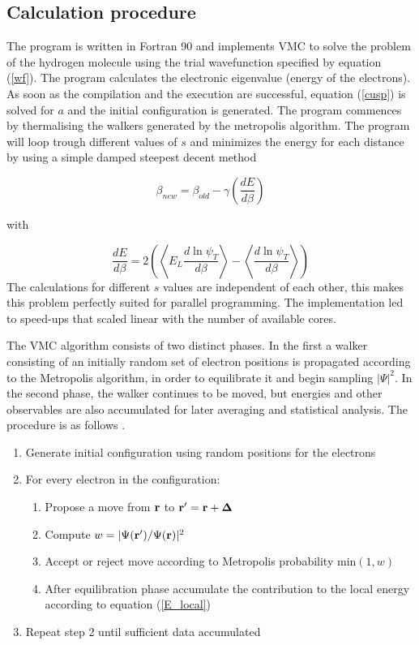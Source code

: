 \documentclass{article}
\begin{document}
\subsection{Calculation procedure}
The program is written in Fortran 90 and implements VMC to solve the  problem of the hydrogen molecule using the trial wavefunction specified by equation (\ref{wf}). The program calculates the electronic eigenvalue (energy of the electrons). As soon as the compilation and the execution are successful, equation (\ref{cusp}) is solved for $a$ and the initial configuration is generated. The program commences by thermalising the walkers generated by the metropolis algorithm. The program will loop trough different values of $s$ and minimizes the energy for each distance by using a simple damped steepest decent method \citep{thijssen2007computational}

\begin{equation}
 \beta_{new}=\beta_{old}-\gamma \left( \frac{dE}{d\beta} \right)
\end{equation}

with 

\begin{equation}
\frac{dE}{d\beta}= 2\left(  \left\langle E_L \frac{d \ln \psi_T }{d \beta} \right\rangle - \left\langle \frac{d \ln \psi_T}{d \beta} \right\rangle \right)
\end{equation}
The calculations for different $s$ values are independent of each other, this makes this problem perfectly suited for parallel programming. The implementation led to speed-ups that scaled linear with the number of available cores.

The VMC algorithm consists of two distinct phases. In the first a walker consisting of an initially random set of electron positions is propagated according to the Metropolis algorithm, in order to equilibrate it and begin sampling $\vert\Psi\vert^2$. In the second phase, the walker continues to be moved, but energies and other observables are also accumulated for later averaging and statistical analysis. The procedure is as follows \citep{thijssen2007computational}.

  \begin{enumerate}
    \item Generate initial configuration using random positions for the electrons
    \item For every electron in the configuration:
    \begin{enumerate}
     \item Propose a move from ${\bf r}$ to  ${\bf r}^\prime=\bf r +\Delta$ 
     \item Compute  $w=\vert\Psi({\bf r}^\prime)/\Psi({\bf r})\vert^2$
     \item Accept or reject move according to Metropolis probability $\mathrm{min}(1,w)$
     \item After equilibration phase accumulate the contribution to the local energy according to equation (\ref{E_local})
    \end{enumerate}
    \item Repeat step 2 until sufficient data accumulated 
  \end{enumerate}
\end{document}
